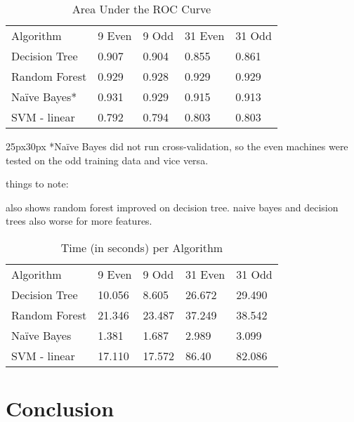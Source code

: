 \documentclass[aps, reprint, amsmath, amssymb]{revtex4-1}
\begin{document}
\begin{table}[H]
  \begin{center}
    \caption{Area Under the ROC Curve} \label{tab:title} 
    \begin{tabular}{ | l || l | l | l | l |}
      \hline
      Algorithm & 9 Even & 9 Odd & 31 Even & 31 Odd \\ \hhline{|=||=|=|=|=|}
      Decision Tree & 0.907 & 0.904 & 0.855 & 0.861 \\ \hline
      Random Forest & 0.929 & 0.928  & 0.929  & 0.929 \\ \hline
      Na{\"i}ve Bayes* & 0.931  & 0.929 & 0.915 & 0.913 \\ \hline
      SVM - linear & 0.792 & 0.794 & 0.803 & 0.803 \\ \hline
    \end{tabular}
  \end{center}
  \begin{changemargin}{25px}{30px}
  \footnotesize{
  *Na{\"i}ve Bayes did not run cross-validation, so the even machines were tested on the odd training data and vice versa.}
  \end{changemargin}
\end{table}

things to note:

also shows random forest improved on decision tree.  
naive bayes and decision trees also worse for more features.

\begin{table}[H]
  \begin{center}
    \caption{Time (in seconds) per Algorithm} \label{tab:title} 
    \begin{tabular}{ | l || l | l | l | l |}  
      \hline
      Algorithm & 9 Even & 9 Odd & 31 Even & 31 Odd \\ \hhline{|=||=|=|=|=|}
      Decision Tree & 10.056 & 8.605 & 26.672 & 29.490 \\ \hline
      Random Forest & 21.346 & 23.487 & 37.249 & 38.542 \\ \hline
      Na{\"i}ve Bayes & 1.381 & 1.687 & 2.989 & 3.099 \\ \hline
      SVM - linear & 17.110 & 17.572 & 86.40 & 82.086 \\ \hline
    \end{tabular}
  \end{center}
\end{table}



\section{Conclusion}
\end{document}
